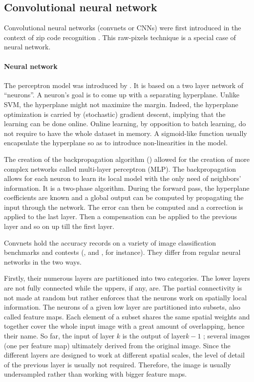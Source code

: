 \documentclass[a4paper]{report}
\begin{document}
\subsection{Convolutional neural network}
Convolutional neural networks (convnets or CNNs) were first introduced in the context of zip code recognition \cite{ConvNet}. This raw-pixels technique is a special case of neural network.
\begin{leftbar}
	\paragraph{Neural network}
	\paragraph{}
	The perceptron model was introduced by \cite{perceptron}. It is based on a two layer network of ``neurons''. A neuron's goal is to come up with a separating hyperplane. Unlike SVM, the hyperplane might not maximize the margin. Indeed, the hyperplane optimization is carried by (stochastic) gradient descent, implying that the learning can be done online. Online learning, by opposition to batch learning, do not require to have the whole dataset in memory. A sigmoid-like function usually encapsulate the hyperplane so as to introduce non-linearities in the model.
	\par
	The creation of the backpropagation algorithm (\cite{backpropagation}) allowed for the creation of more complex networks called multi-layer perceptron (MLP). The backpropagation allows for each neuron to learn its local model with the only need of neighbors' information. It is a two-phase algorithm. During the forward pass, the hyperplane coefficients are known and a global output can be computed by propagating the input through the network. The error can then be computed and a correction is applied to the last layer. Then a compensation can be applied to the previous layer and so on up till the first layer. 
\end{leftbar}	
Convnets hold the accuracy records on a variety of image classification benchmarks and contests (\cite{ImagenetRecord}, \cite{convnetRecord} and \cite{bestcifar}, for instance). They differ from regular neural networks in the two ways.
\par
Firstly, their numerous layers are partitioned into two categories. The lower layers are not fully connected while the uppers, if any, are. The partial connectivity is not made at random but rather enforces that the neurons work on spatially local information. The neurons of a given low layer are partitioned into subsets, also called feature maps. Each element of a subset shares the same spatial weights and together cover the whole input image with a great amount of overlapping, hence their name. So far, the input of layer $k$ is the output of layer$k-1$ ; several images (one per feature map) ultimately derived from the original image. Since the different layers are designed to work at different spatial scales, the level of detail of the previous layer is usually not required. Therefore, the image is usually undersampled rather than working with bigger feature maps.
\end{document}
